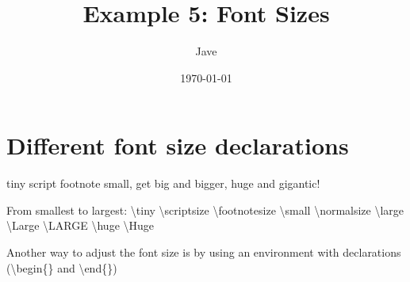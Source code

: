 \documentclass[letterpaper, 12pt]{article}
\begin{document}
\title{Example 5: Font Sizes}
\date{\today}
\author{Jave}
\maketitle

\newcommand{\tinyEx}{\textbackslash{}tiny}
\newcommand{\scriptsizeEx}{\textbackslash{}scriptsize}
\newcommand{\footnotesizeEx}{\textbackslash{}footnotesize}
\newcommand{\smallEx}{\textbackslash{}small}
\newcommand{\normalsizeEx}{\textbackslash{}normalsize}
\newcommand{\largeEx}{\textbackslash{}large}
\newcommand{\LargeEx}{\textbackslash{}Large}
\newcommand{\LARGEEx}{\textbackslash{}LARGE}
\newcommand{\hugeEx}{\textbackslash{}huge}
\newcommand{\HugeEx}{\textbackslash{}Huge}

\newcommand{\beginEx}{\textbackslash{}begin\{\}}
\newcommand{\Exend}{\textbackslash{}end\{\}} %

\section{Different font size declarations}

\noindent \tiny tiny \scriptsize script \footnotesize footnote \small small, 
\normalsize get \large big \Large and \LARGE bigger, \huge huge \newline
\Huge and gigantic!

\vspace{10.0mm}
\normalsize
\noindent From smallest to largest: \newline
\tinyEx{} \scriptsizeEx{} \footnotesizeEx{} \smallEx{} \normalsizeEx{}
\largeEx{} \LargeEx{} \LARGEEx{} \hugeEx{} \HugeEx{}

Another way to adjust the font size is by using 
an environment with declarations (\beginEx{} and \Exend)
\end{document}

